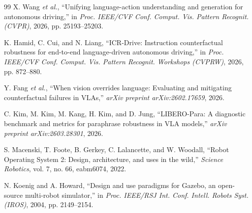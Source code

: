 \documentclass[letterpaper,conference]{IEEEtran}
\begin{document}
\begin{thebibliography}{99}
X. Wang \emph{et al.}, ``Unifying language-action understanding and generation
for autonomous driving,'' in \emph{Proc. IEEE/CVF Conf. Comput. Vis. Pattern
Recognit. (CVPR)}, 2026, pp. 25193--25203.

K. Hamid, C. Cui, and N. Liang,
``ICR-Drive: Instruction counterfactual robustness for end-to-end language-driven
autonomous driving,'' in \emph{Proc. IEEE/CVF Conf. Comput. Vis. Pattern
Recognit. Workshops (CVPRW)}, 2026, pp. 872--880.

Y. Fang \emph{et al.},
``When vision overrides language: Evaluating and mitigating counterfactual
failures in VLAs,''
\emph{arXiv preprint arXiv:2602.17659}, 2026.

C. Kim, M. Kim, M. Kang, H. Kim, and D. Jung,
``LIBERO-Para: A diagnostic benchmark and metrics for paraphrase robustness in
VLA models,''
\emph{arXiv preprint arXiv:2603.28301}, 2026.

S. Macenski, T. Foote, B. Gerkey, C. Lalancette, and W. Woodall,
``Robot Operating System 2: Design, architecture, and uses in the wild,''
\emph{Science Robotics}, vol. 7, no. 66, eabm6074, 2022.

N. Koenig and A. Howard, ``Design and use paradigms for Gazebo, an open-source
multi-robot simulator,'' in \emph{Proc. IEEE/RSJ Int. Conf. Intell. Robots
Syst. (IROS)}, 2004, pp. 2149--2154.

\end{thebibliography}
\end{document}
